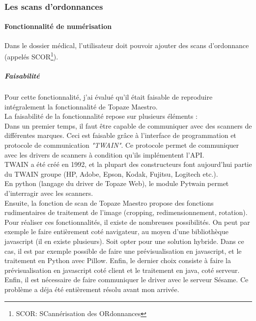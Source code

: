 \subsubsection{Les scans d'ordonnances}
\paragraph*{Fonctionnalité de numérisation\\}
Dans le dossier médical, l'utilisateur doit pouvoir ajouter des scans d'ordonnance (appelés SCOR\footnote{SCOR: SCannérisation des ORdonnances}).

\subparagraph*{Faisabilité}
Pour cette fonctionnalité, j'ai évalué qu'il était faisable de reproduire intégralement la fonctionnalité de Topaze Maestro.\\

La faisabilité de la fonctionnalité repose sur plusieurs éléments :\\
Dans un premier temps, il faut être capable de communiquer avec des scanners de différentes marques. Ceci est faisable grâce à l'interface de programmation et protocole de communication \textit{"TWAIN"}. Ce protocole permet de communiquer avec les drivers de  scanners à condition qu'ils implémentent l'API.\\
TWAIN a été créé en 1992, et la plupart des constructeurs font aujourd'hui partie du TWAIN groupe (HP, Adobe, Epson, Kodak, Fujitsu, Logitech etc.).\\
En python (langage du driver de Topaze Web), le module Pytwain permet d'interragir avec les scanners.\\

Ensuite, la fonction de scan de Topaze Maestro propose des fonctions rudimentaires de traitement de l'image (cropping, redimensionnement, rotation). 
Pour réaliser ces fonctionnalités, il existe de nombreuses possibilités. On peut par exemple le faire entièrement coté navigateur, au moyen d'une bibliothèque javascript (il en existe plusieurs). Soit opter pour une solution hybride. Dans ce cas, il est par exemple possible de faire une prévisualisation en javascript, et le traitement en Python avec Pillow. 
Enfin, le dernier choix consiste à faire la prévisualisation en javascript coté client et le traitement en java, coté serveur. \\

Enfin, il est nécessaire de faire communiquer le driver avec le serveur Sésame. Ce problème a déja été entièrement résolu avant mon arrivée.

